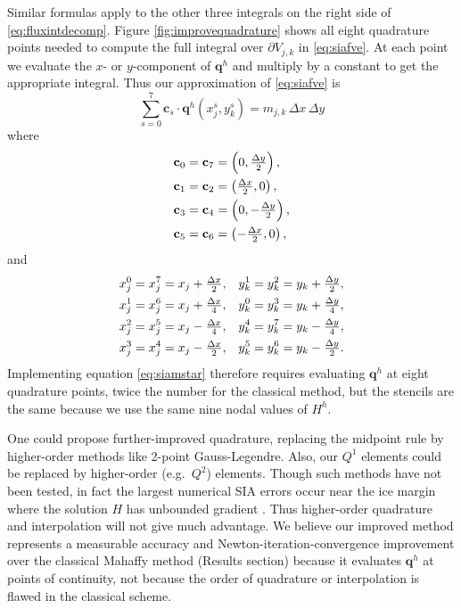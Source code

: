 \documentclass[twocolumn,letterpaper]{igs}
\newcommand\bc{\mathbf{c}}
\newcommand\bq{\mathbf{q}}
\begin{document}
Similar formulas apply to the other three integrals on the right side of \eqref{eq:fluxintdecomp}.  Figure \ref{fig:improvequadrature} shows all eight quadrature points needed to compute the full integral over $\partial V_{j,k}$ in \eqref{eq:siafve}.  At each point we evaluate the $x$- or $y$-component of $\bq^h$ and multiply by a constant to get the appropriate integral.  Thus our approximation of \eqref{eq:siafve} is
\begin{equation}
\sum_{s=0}^7 \bc_s \cdot \bq^h(x_j^s,y_k^s) = m_{j,k}\,\Delta x\,\Delta y  \label{eq:siamstar}
\end{equation}
where
\begin{align}
\bc_0 &= \bc_7 = \left(0, \tfrac{\Delta y}{2}\right),  \label{eq:cs} \\
\bc_1 &= \bc_2 = \left(\tfrac{\Delta x}{2},0\right),  \notag \\
\bc_3 &= \bc_4 = \left(0, -\tfrac{\Delta y}{2}\right),  \notag \\
\bc_5 &= \bc_6 = \left(-\tfrac{\Delta x}{2},0\right),  \notag
\end{align}
and
\begin{align}
x_j^0 &= x_j^7 = x_j + \tfrac{\Delta x}{2}, & y_k^1 &= y_k^2 = y_k + \tfrac{\Delta y}{2}, \label{eq:xjsyks} \\
x_j^1 &= x_j^6 = x_j + \tfrac{\Delta x}{4}, & y_k^0 &= y_k^3 = y_k + \tfrac{\Delta y}{4}, \notag \\
x_j^2 &= x_j^5 = x_j - \tfrac{\Delta x}{4}, & y_k^4 &= y_k^7 = y_k - \tfrac{\Delta y}{4}, \notag \\
x_j^3 &= x_j^4 = x_j - \tfrac{\Delta x}{2}, & y_k^5 &= y_k^6 = y_k - \tfrac{\Delta y}{2}. \notag
\end{align}
Implementing equation \eqref{eq:siamstar} therefore requires evaluating $\bq^h$ at eight quadrature points, twice the number for the classical method, but the stencils are the same because we use the same nine nodal values of $H^h$.

One could propose further-improved quadrature, replacing the midpoint rule by higher-order methods like 2-point Gauss-Legendre.  Also, our $Q^1$ elements could be replaced by higher-order (e.g.~$Q^2$) elements.  Though such methods have not been tested, in fact the largest numerical SIA errors occur near the ice margin where the solution $H$ has unbounded gradient \citep{Bueleretal2005}.  Thus higher-order quadrature and interpolation will not give much advantage.  We believe our improved method represents a measurable accuracy and Newton-iteration-convergence improvement over the classical Mahaffy method (Results section) because it evaluates $\bq^h$ at points of continuity, not because the order of quadrature or interpolation is flawed in the classical scheme.
\end{document}
